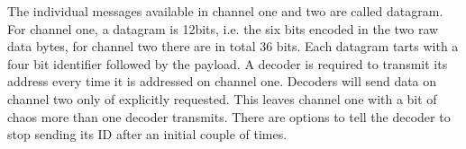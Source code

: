 \begin{center}
\end{center}

The individual messages available in channel one and two are called datagram. For channel one, a datagram is 12bits, i.e. the six bits encoded in the two raw data bytes, for channel two there are in total 36 bits. Each datagram tarts with a four bit identifier followed by the payload. A decoder is required to transmit its address every time it is addressed on channel one. Decoders will send data on channel two only of explicitly requested. This leaves channel one with a bit of chaos more than one decoder transmits. There are options to tell the decoder to stop sending its ID after an initial couple of times.

